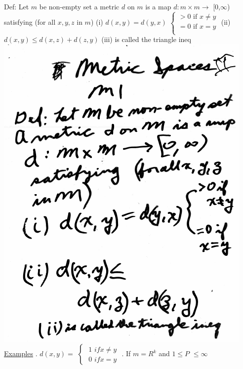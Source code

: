 \documentclass[10pt,a4paper]{article}
\begin{document}
{{Def: Let $m$ be non-empty set a metric $d$ on $m$ is a map
\newline
$d: m \times m \rightarrow$ [0,$\infty$)
\newline
satisfying (for all $x,y,z$ in $m$)
\newline
(i) $d(x,y)=d(y,x)$
$\begin{cases}
>0 \mbox{ if } x \neq y \\
=0 \mbox { if } x=y \\
\end{cases}$
\newline
(ii) $d(x,y)\leq d(x,z)+d(z,y)$
\newline
(iii) is called the triangle ineq
\newline
\includegraphics[scale=.5]{Pages/MS_2_im1}
\newpage
\underline{Examples}
. $d(x,y) =$
$\begin{cases}
\mbox { 1 } if x \neq y \\
\mbox { 0 } if x = y
\end{cases}$
. If $m=R^k$ and $1\leq P$ $\leq \infty$
}}
\end{document}
